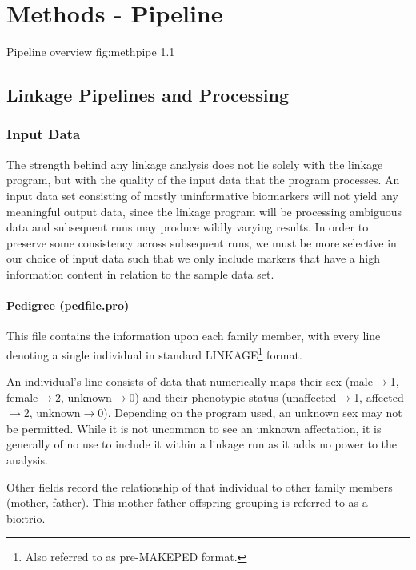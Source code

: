 \chapter{Methods - Pipeline}

{Pipeline overview}
{fig:methpipe}
{1.1}{}

\section{Linkage Pipelines and Processing}



\subsection{Input Data}

The strength behind any linkage analysis does not lie solely with the linkage program, but with the quality of the input data that the program processes. An input data set consisting of mostly uninformative \gls{bio:markers} will not yield any meaningful output data, since the linkage program will be processing ambiguous data and subsequent runs may produce wildly varying results. In order to preserve some consistency across subsequent runs, we must be more selective in our choice of input data such that we only include markers that have a high information content in relation to the sample data set.
\enlargethispage{\baselineskip}

\subsubsection{Pedigree (pedfile.pro)}

This file contains the information upon each family member, with every line denoting a single individual in standard LINKAGE\footnote{Also referred to as pre-MAKEPED format.} format.

An individual's line consists of data that numerically maps their sex ({male\(\rightarrow\)1, female\(\rightarrow\)2, unknown\(\rightarrow\)0}) and their phenotypic status ({unaffected\(\rightarrow\)1, affected\(\rightarrow\)2, unknown\(\rightarrow\)0}). Depending on the program used, an unknown sex may not be permitted. While it is not uncommon to see an unknown affectation, it is generally of no use to include it within a linkage run as it adds no power to the analysis.

Other fields record the relationship of that individual to other family members (mother, father). This mother-father-offspring grouping is referred to as a \gls{bio:trio}.

